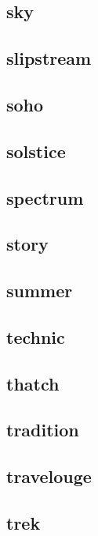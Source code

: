 \subsection{\ttfamily sky}
\newpage
\subsection{\ttfamily slipstream}
\newpage
\subsection{\ttfamily soho}
\newpage
\subsection{\ttfamily solstice}
\newpage
\subsection{\ttfamily spectrum}
\newpage
\subsection{\ttfamily story}
\newpage
\subsection{\ttfamily summer}
\newpage
\subsection{\ttfamily technic}
\newpage
\subsection{\ttfamily thatch}
\newpage
\subsection{\ttfamily tradition}
\newpage
\subsection{\ttfamily travelouge}
\newpage
\subsection{\ttfamily trek}
\newpage
